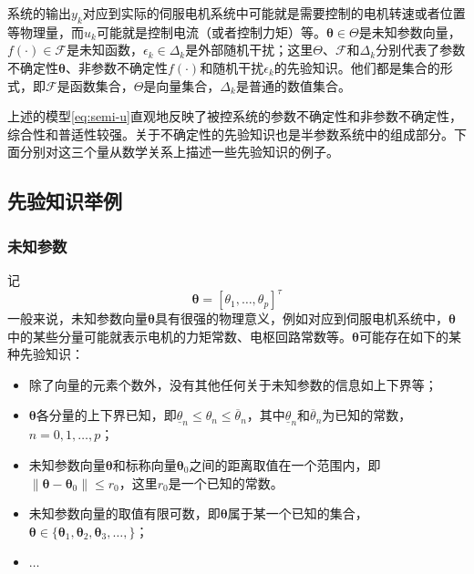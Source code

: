 系统的输出$y_{k}$对应到实际的伺服电机系统中可能就是需要控制的电机转速或者位置等物理量，而$u_k$可能就是控制电流（或者控制力矩）等。$\bm{\theta}\in\Theta$是未知参数向量，$f(\cdot)\in\mathcal{F}$是未知函数，$\epsilon_{k}\in\Delta_{k}$是外部随机干扰；这里$\Theta$、$\mathcal{F}$和$\Delta_{k}$分别代表了参数不确定性$\bm{\theta}$、非参数不确定性$f(\cdot)$和随机干扰$\epsilon_{k}$的先验知识。他们都是集合的形式，即$\mathcal{F}$是函数集合，$\Theta$是向量集合，$\Delta_{k}$是普通的数值集合。

上述的模型\eqref{eq:semi-u}直观地反映了被控系统的参数不确定性和非参数不确定性，综合性和普适性较强。关于不确定性的先验知识也是半参数系统中的组成部分。下面分别对这三个量从数学关系上描述一些先验知识的例子。
\subsection{先验知识举例}\label{subsect:2.2.2}
\subsubsection{未知参数}\label{subsubsect:2.2.2.1}
记
\begin{equation}%
\label{eq:}
\bm{\theta} = [\theta_{1},\ldots,\theta_{p}]^{\tau}
\end{equation}
一般来说，未知参数向量$\bm{\theta}$具有很强的物理意义，例如对应到伺服电机系统中，$\bm{\theta}$中的某些分量可能就表示电机的力矩常数、电枢回路常数等。$\bm{\theta}$可能存在如下的某种先验知识：
\begin{itemize}
\item 除了向量的元素个数外，没有其他任何关于未知参数的信息如上下界等；
\item $\bm{\theta}$各分量的上下界已知，即$\underline{\theta}_{n}\leq\theta_{n}\leq\overline{\theta}_{n}$，其中$\underline{\theta}_{n}$和$\overline{\theta}_{n}$为已知的常数，$n=0,1,\ldots,p$；
\item 未知参数向量$\bm{\theta}$和标称向量$\bm{\theta}_{0}$之间的距离取值在一个范围内，即$\|\bm{\theta}-\bm{\theta}_{0}\|\leq r_{0}$，这里$r_{0}$是一个已知的常数。
\item 未知参数向量的取值有限可数，即$\bm{\theta}$属于某一个已知的集合，$\bm{\theta}\in\{\bm{\theta}_{1},\bm{\theta}_{2},\bm{\theta}_{3},\dots,\}$；
\item $\dots$
\end{itemize} 
